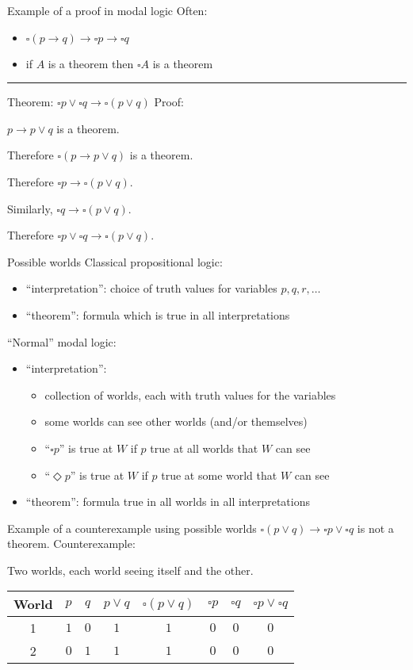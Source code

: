 \documentclass{beamer}
\newcommand{\nec}{\square}
\newcommand{\poss}{\Diamond}
\begin{document}
\begin{frame}{Example of a proof in modal logic}
Often:
\begin{itemize}
\item $\nec (p\to q) \to \nec p \to \nec q$
\item if $A$ is a theorem then $\nec A$ is a theorem
\end{itemize}

\vfill
\hrule
\vfill

Theorem: $\nec p\lor \nec q \to \nec (p\lor q)$
\vfill
Proof:

$p\to p\lor q$ is a theorem.

Therefore $\nec (p\to p\lor q)$ is a theorem.

Therefore $\nec p\to \nec(p\lor q)$.

Similarly, $\nec q\to \nec(p\lor q)$.

Therefore $\nec p\lor\nec q\to\nec(p\lor q)$.
\vfill
\end{frame}

\begin{frame}{Possible worlds}
Classical propositional logic:
\begin{itemize}
\item ``interpretation'': choice of truth values for variables $p,q,r,\dotsc$
\item ``theorem'': formula which is true in all interpretations
\end{itemize}
\vfill
``Normal'' modal logic:
\begin{itemize}
\item ``interpretation'':
    \begin{itemize}
    \item collection of worlds, each with truth values for the variables
    \item some worlds can see other worlds (and/or themselves)
    \item ``$\nec p$'' is true at $W$ if $p$ true at all worlds that $W$ can see
    \item ``$\poss p$'' is true at $W$ if $p$ true at some world that $W$ can see
    \end{itemize}
\item ``theorem'': formula true in all worlds in all interpretations
\end{itemize}
\end{frame}

\begin{frame}{Example of a counterexample using possible worlds}
$\nec(p\lor q)\to\nec p\lor\nec q$ is not a theorem.
\vfill
Counterexample:

\addvspace{\baselineskip}
Two worlds, each world seeing itself and the other.

\addvspace{\baselineskip}
\begin{tabular}{c|cc|cc|ccc}
World & $p$ & $q$ & $p\lor q$ & $\nec (p\lor q)$ & $\nec p$ & $\nec q$ & $\nec p\lor\nec q$ \\
\hline
1 & $1$ & $0$ & $1$ & $1$ & $0$ & $0$ & $0$ \\
2 & $0$ & $1$ & $1$ & $1$ & $0$ & $0$ & $0$ \\
\end{tabular}
\end{frame}
\end{document}
